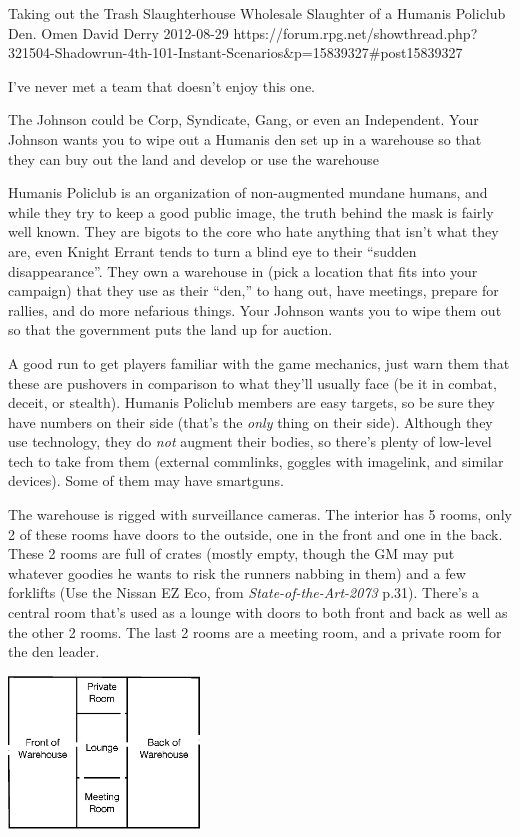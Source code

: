 \begin{scenario}{Taking out the Trash}
	{Slaughterhouse}
	{Wholesale Slaughter of a Humanis Policlub Den.}
	{Omen David Derry}
	{2012-08-29}
	{https://forum.rpg.net/showthread.php?321504-Shadowrun-4th-101-Instant-Scenarios\&p=15839327#post15839327}

I've never met a team that doesn't enjoy this one.

 The Johnson could be Corp, Syndicate, Gang, or even an Independent. Your Johnson wants you to wipe out a Humanis den set up in a warehouse so that they can buy out the land and develop or use the warehouse

\synopsis Humanis Policlub is an organization of non-augmented mundane humans, and while they try to keep a good public image, the truth behind the mask is fairly well known. They are bigots to the core who hate anything that isn't what they are, even Knight Errant tends to turn a blind eye to their ``sudden disappearance''. They own a warehouse in (pick a location that fits into your campaign) that they use as their ``den,'' to hang out, have meetings, prepare for rallies, and do more nefarious things. Your Johnson wants you to wipe them out so that the government puts the land up for auction.

\notes A good run to get players familiar with the game mechanics, just warn them that these are pushovers in comparison to what they'll usually face (be it in combat, deceit, or stealth). Humanis Policlub members are easy targets, so be sure they have numbers on their side (that's the \textit{only} thing on their side). Although they use technology, they do \textit{not} augment their bodies, so there's plenty of low-level tech to take from them (external commlinks, goggles with imagelink, and similar devices). Some of them may have smartguns.

The warehouse is rigged with surveillance cameras. The interior has 5 rooms, only 2 of these rooms have doors to the outside, one in the front and one in the back. These 2 rooms are full of crates (mostly empty, though the GM may put whatever goodies he wants to risk the runners nabbing in them) and a few forklifts (Use the Nissan EZ Eco, from \textit{State-of-the-Art-2073} p.31). There's a central room that's used as a lounge with doors to both front and back as well as the other 2 rooms. The last 2 rooms are a meeting room, and a private room for the den leader.

\begin{center}
\includegraphics[width=2in]{taking-out-the-trash-map}
\end{center}

\end{scenario}